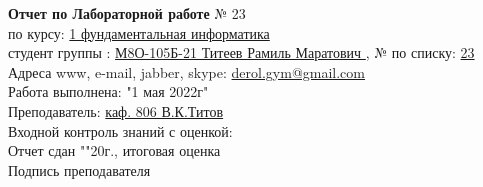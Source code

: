 \documentclass[10pt]{report}
\begin{document}
    \begin{spacing}{1.7}
        \hspace{1.2in}
        \textbf {Отчет по Лабораторной работе} № 23\\     %
        \indent \hspace{1.2in} по курсу: \underline{1 фундаментальная информатика } \\
        \indent \hspace{1.2in} студент группы : \underline{М8О-105Б-21 Титеев Рамиль Маратович }, № по списку: \underline{ 23 } \\
        \indent \hspace{1.2in} Адреса www, e-mail, jabber, skype: \underline{ derol.gym@gmail.com } \\
        \indent \hspace{1.2in} Работа выполнена: "1 мая 2022г" \\   %
        \indent \hspace{1.2in} Преподаватель: \underline{ каф. 806 В.К.Титов} \\
        \indent \hspace{1.2in} Входной контроль знаний с оценкой: \tlinee{2in} \\
        \indent \hspace{1.2in} Отчет сдан "\tlinee{0.2in}"\tlinee{1in}20\tlinee{0.2in}г., итоговая оценка \tlinee{1in}\\
        \indent \hspace{1.2in} Подпись преподавателя \tlinee{1.2in}\\
    \end{spacing}
    
\end{document}

